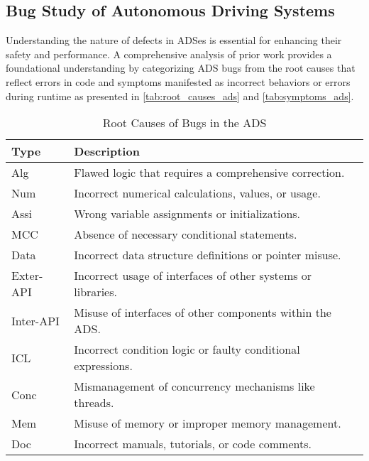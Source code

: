 \subsection{Bug Study of Autonomous Driving Systems}

Understanding the nature of defects in ADSes is essential for enhancing their safety and performance. A comprehensive analysis of prior work \cite{GarciaF0AXC20} provides a foundational understanding by categorizing ADS bugs from the root causes that reflect errors in code and symptoms manifested as incorrect behaviors or errors during runtime as presented in \autoref{tab:root_causes_ads} and \autoref{tab:symptoms_ads}.

\vspace{-1.5ex}
\begin{table}[ht!]
    \centering
    \begin{minipage}{0.52\linewidth}
        \centering
        \caption{Root Causes of Bugs in the ADS}
        \begin{adjustbox}{width=\linewidth}
        \begin{tabular}{|l|l|}
        \hline
        \textbf{Type} & \textbf{Description} \\
        \hline
        Alg & Flawed logic that requires a comprehensive correction. \\
        \hline
        Num & Incorrect numerical calculations, values, or usage. \\
        \hline
        Assi & Wrong variable assignments or initializations. \\
        \hline
        MCC & Absence of necessary conditional statements. \\
        \hline
        Data & Incorrect data structure definitions or pointer misuse. \\
        \hline
        Exter-API & Incorrect usage of interfaces of other systems or libraries. \\
        \hline
        Inter-API & Misuse of interfaces of other components within the ADS. \\
        \hline
        ICL & Incorrect condition logic or faulty conditional expressions. \\
        \hline
        Conc & Mismanagement of concurrency mechanisms like threads. \\
        \hline
        Mem & Misuse of memory or improper memory management. \\
        \hline
        Doc & Incorrect manuals, tutorials, or code comments. \\

\end{tabular}
\end{adjustbox}
\end{minipage}
\end{table}

